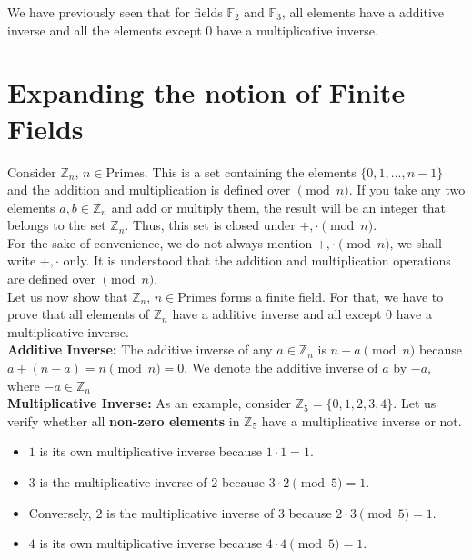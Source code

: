 \documentclass[11pt]{article}
\theoremstyle{definition}
\theoremstyle{plain}
\begin{document}
We have previously seen that for fields $\mathbb{F}_{2}$ and $\mathbb{F}_{3}$, all elements have a additive inverse and all the elements except $0$ have a multiplicative inverse.\\

\section{Expanding the notion of Finite Fields}

Consider $\mathbb{Z}_{n}$, $n \in \text{Primes}$. This is a set containing the elements $\{0, 1, ..., n-1\}$ and the addition and multiplication is defined over $\pmod{n}$. If you take any two elements $a, b \in \mathbb{Z}_{n}$ and add or multiply them, the result will be an integer that belongs to the set $\mathbb{Z}_{n}$. Thus, this set is closed under $+, \cdot \pmod{n}$.\\

For the sake of convenience, we do not always mention $+, \cdot \pmod{n}$, we shall write $+, \cdot$ only. It is understood that the addition and multiplication operations are defined over $\pmod{n}$.\\

Let us now show that $\mathbb{Z}_{n}$, $n \in \text{Primes}$ forms a finite field. For that, we have to prove that all elements of $\mathbb{Z}_{n}$ have a additive inverse and all except $0$ have a multiplicative inverse.\\

\textbf{Additive Inverse:} The additive inverse of any $a \in \mathbb{Z}_{n}$ is $n-a \pmod{n}$ because $a + (n-a) = n \pmod{n} = 0$. We denote the additive inverse of $a$ by $-a$, where $-a \in \mathbb{Z}_{n}$\\

\textbf{Multiplicative Inverse:} As an example, consider $\mathbb{Z}_{5} = \{0, 1, 2, 3, 4\}$. Let us verify whether all \textbf{non-zero elements} in $\mathbb{Z}_{5}$ have a multiplicative inverse or not.

\begin{itemize}
  \item $1$ is its own multiplicative inverse because $1 \cdot 1 = 1$.
  \item $3$ is the multiplicative inverse of $2$ because $3 \cdot 2 \pmod{5} = 1$.
  \item Conversely, $2$ is the multiplicative inverse of $3$ because $2 \cdot 3 \pmod{5} = 1$.
  \item $4$ is its own multiplicative inverse because $4 \cdot 4 \pmod{5} = 1$.
\end{itemize}
\end{document}
